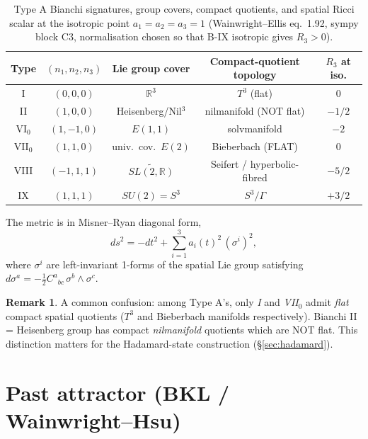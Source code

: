 \documentclass[11pt,a4paper]{article}
\theoremstyle{definition}
\newtheorem{remark}[theorem]{Remark}
\newcommand{\R}{\mathbb{R}}
\begin{document}
\begin{table}[ht]
\centering
\begin{tabular}{|c|c|c|c|c|}
\hline
Type   & $(n_1,n_2,n_3)$ & Lie group cover  & Compact-quotient topology    & $R_3$ at iso. \\
\hline
I      & $(0,0,0)$       & $\R^3$           & $T^3$ (flat)                 & $0$           \\
II     & $(1,0,0)$       & Heisenberg/Nil$^3$  & nilmanifold (NOT flat)    & $-1/2$        \\
VI$_0$ & $(1,-1,0)$      & $E(1,1)$         & solvmanifold                 & $-2$          \\
VII$_0$ & $(1,1,0)$      & univ.\ cov.\ $E(2)$ & Bieberbach (FLAT)         & $0$           \\
VIII   & $(-1,1,1)$      & $\widetilde{SL(2,\R)}$ & Seifert / hyperbolic-fibred & $-5/2$    \\
IX     & $(1,1,1)$       & $SU(2) = S^3$    & $S^3 / \Gamma$               & $+3/2$        \\
\hline
\end{tabular}
\caption{Type A Bianchi signatures, group covers, compact quotients, and
spatial Ricci scalar at the isotropic point $a_1 = a_2 = a_3 = 1$
(Wainwright--Ellis eq.\ 1.92, sympy block C3, normalisation chosen so
that B-IX isotropic gives $R_3 > 0$).}
\label{tab:behr}
\end{table}

The metric is in Misner--Ryan diagonal form,
\begin{equation}\label{eq:metric}
  ds^2 = -dt^2 + \sum_{i=1}^{3} a_i(t)^2 \,(\sigma^i)^2,
\end{equation}
where $\sigma^i$ are left-invariant 1-forms of the spatial Lie group
satisfying $d\sigma^a = -\tfrac12 C^a{}_{bc}\,\sigma^b \wedge \sigma^c$.

\begin{remark}\label{rem:flat-quotient}
A common confusion: among Type A's, only \emph{I} and \emph{VII$_0$} admit
\emph{flat} compact spatial quotients ($T^3$ and Bieberbach manifolds
respectively). Bianchi II = Heisenberg group has compact \emph{nilmanifold}
quotients which are NOT flat. This distinction matters for the Hadamard-state
construction (\S\ref{sec:hadamard}).
\end{remark}

\section{Past attractor (BKL / Wainwright--Hsu)}
\end{document}
